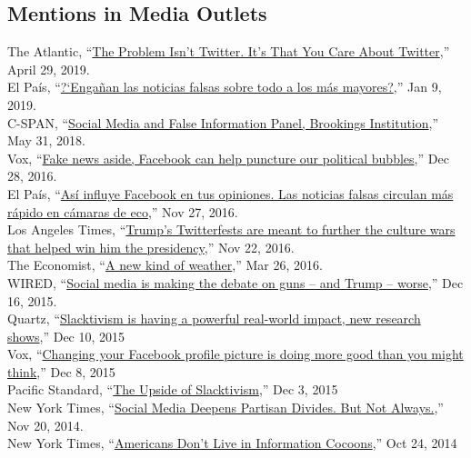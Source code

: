 \documentclass[margin,line,11pt]{resume}
\newcommand{\nl}{\vspace{0.10in}\\}
\begin{document}
\begin{resume}
                \section{\mysidestyle Mentions in Media Outlets}
The Atlantic, ``\href{https://www.theatlantic.com/ideas/archive/2019/04/political-leaders-should-stop-caring-about-twitter/588004/}{The Problem Isn't Twitter. It's That You Care About Twitter},'' April 29, 2019.\nl
El Pa\'{i}s, ``\href{https://elpais.com/tecnologia/2019/01/09/actualidad/1547029983_955487.html}{?`Enga\~{n}an las noticias falsas sobre todo a los m\'{a}s mayores?},'' Jan 9, 2019.\nl
C-SPAN, ``\href{https://www.c-span.org/video/?446330-3/social-media-false-information-panel-2}{Social Media and False Information Panel, Brookings Institution},'' May 31, 2018.\nl                
Vox, ``\href{http://www.vox.com/the-big-idea/2016/12/28/14095452/fake-news-political-bubbles-democracy-facebook}{Fake news aside, Facebook can help puncture our political bubbles},'' Dec 28, 2016.\nl
El Pa\'{i}s, ``\href{http://internacional.elpais.com/internacional/2016/11/25/actualidad/1480095728_565471.html}{As\'{i} influye Facebook en tus opiniones. Las noticias falsas circulan m\'{a}s r\'{a}pido en c\'{a}maras de eco},'' Nov 27, 2016.\nl
Los Angeles Times, ``\href{http://www.latimes.com/politics/la-na-pol-trump-twitter-20161122-story.html}{Trump's Twitterfests are meant to further the culture wars that helped win him the presidency},'' Nov 22, 2016.\nl 
The Economist, ``\href{http://www.economist.com/news/special-report/21695192-social-media-now-play-key-role-collective-action-new-kind-weather}{A new kind of weather},'' Mar 26, 2016.\nl
WIRED, ``\href{http://www.wired.com/2015/12/social-media-is-making-the-debate-on-guns-and-trump-worse/}{Social media is making the debate on guns -- and Trump -- worse},'' Dec 16, 2015.\nl
Quartz, ``\href{http://qz.com/570009/slacktivism-is-having-a-powerful-real-world-impact-new-research-shows/}{Slacktivism is having a powerful real-world impact, new research shows},'' Dec 10, 2015\nl
Vox, ``\href{http://www.vox.com/2015/12/8/9873822/social-media-activism-science}{Changing your Facebook profile picture is doing more good than you might think},'' Dec 8, 2015\nl
Pacific Standard, ``\href{https://psmag.com/the-upside-of-slacktivism-2a93294941b0#.hp2xyepdf}{The Upside of Slacktivism},'' Dec 3, 2015\nl
New York Times, ``\href{http://www.nytimes.com/2014/11/21/upshot/social-media-deepens-partisan-divides-but-not-always.html?_r=0}{Social Media Deepens Partisan Divides. But Not Always.},'' Nov 20, 2014.\nl
New York Times, ``\href{http://www.nytimes.com/2014/10/25/upshot/americans-dont-live-in-information-cocoons.html?_r=0}{Americans Don't Live in Information Cocoons},'' Oct 24, 2014\nl

\end{resume}
\end{document}
